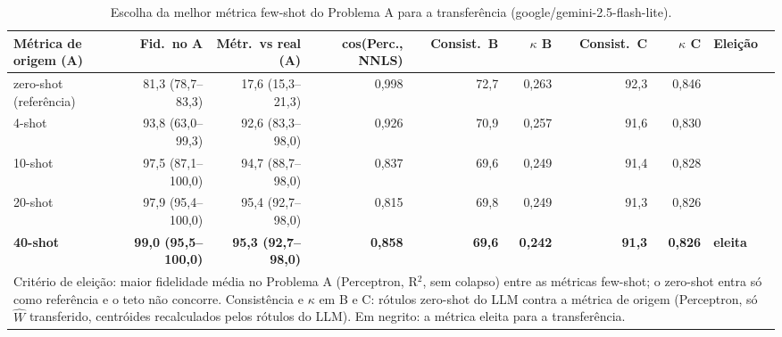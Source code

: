 \begin{table}[htbp]
\centering
\small
\caption{Escolha da melhor métrica few-shot do Problema A para a transferência (google/gemini-2.5-flash-lite).}
\label{tab:T7_escolha_flashlite}
\begin{tabular}{lrrrrrrrl}
\toprule
Métrica de origem (A) & Fid.\ no A & Métr.\ vs real (A) & cos(Perc., NNLS) & Consist.\ B & $\kappa$ B & Consist.\ C & $\kappa$ C & Eleição \\
\midrule
zero-shot (referência) & 81,3 (78,7–83,3) & 17,6 (15,3–21,3) & 0,998 & 72,7 & 0,263 & 92,3 & 0,846 &  \\
4-shot & 93,8 (63,0–99,3) & 92,6 (83,3–98,0) & 0,926 & 70,9 & 0,257 & 91,6 & 0,830 &  \\
10-shot & 97,5 (87,1–100,0) & 94,7 (88,7–98,0) & 0,837 & 69,6 & 0,249 & 91,4 & 0,828 &  \\
20-shot & 97,9 (95,4–100,0) & 95,4 (92,7–98,0) & 0,815 & 69,8 & 0,249 & 91,3 & 0,826 &  \\
\textbf{40-shot} & \textbf{99,0 (95,5–100,0)} & \textbf{95,3 (92,7–98,0)} & \textbf{0,858} & \textbf{69,6} & \textbf{0,242} & \textbf{91,3} & \textbf{0,826} & \textbf{eleita} \\
\bottomrule
\multicolumn{9}{p{0.95\linewidth}}{\footnotesize Critério de eleição: maior fidelidade média no Problema A (Perceptron, R$^2$, sem colapso) entre as métricas few-shot; o zero-shot entra só como referência e o teto não concorre. Consistência e $\kappa$ em B e C: rótulos zero-shot do LLM contra a métrica de origem (Perceptron, só $\hat{W}$ transferido, centróides recalculados pelos rótulos do LLM). Em negrito: a métrica eleita para a transferência.} \\
\end{tabular}
\end{table}
